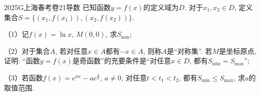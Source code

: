 
\begin{problem}{2025}{G}{上海春考卷}{21}{导数}
已知函数$y=f(x)$的定义域为$D$. 对于$x_1, x_2 \in D$, 定义集合$S=\{(x_1, f(x_1)), (x_2, f(x_2))\}$.

（1）记$f(x)=\ln x$, $M(0,0)$, 求$S_{\min}$;

（2）对于集合$A$, 若对任意$x \in A$都有$-x \in A$, 则称$A$是“对称集”. 若$M$是坐标原点, 证明: “函数$y=f(x)$是奇函数”的充要条件是“对任意$x \in D$, 都有$S_{\min}=S_{\max}$”;

（3）若函数$f(x)=e^{ax}-ae^{\frac{x}{a}}$, $a \neq 0$, 对任意$t < t_1 < t_2$, 都有$S_{\min} \le S_{\max}$, 求$a$的取值范围.
\end{problem}